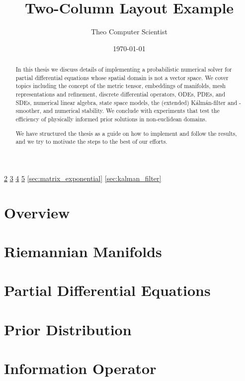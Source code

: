 
\def\COMPILINGFROMMAIN{}


\title{Two-Column Layout Example}
\author{Theo Computer Scientist}
\date{\today}
\maketitle


\begin{abstract}
In this thesis we discuss details of implementing a probabilistic numerical solver for partial differential equations whose spatial domain is not a vector space. We cover topics including the concept of the metric tensor, embeddings of manifolds, mesh representations and refinement, discrete differential operators, ODEs, PDEs, and SDEs, numerical linear algebra, state space models, the (extended) Kálmán-filter and -smoother, and numerical stability. We conclude with experiments that test the efficiency of physically informed prior solutions in non-euclidean domains.

We have structured the thesis as a guide on how to implement and follow the results, and we try to motivate the steps to the best of our efforts.
\end{abstract}

\ref{sec:manifolds}
\ref{sec:pde}
\ref{sec:prior}
\ref{sec:residual}
\ref{sec:matrix_exponential}
\ref{sec:kalman_filter}

\section{Overview}\label{sec:overview}


\section{Riemannian Manifolds}\label{sec:manifolds}


\section{Partial Differential Equations}\label{sec:pde}


\section{Prior Distribution}\label{sec:prior}


\section{Information Operator}\label{sec:residual}


